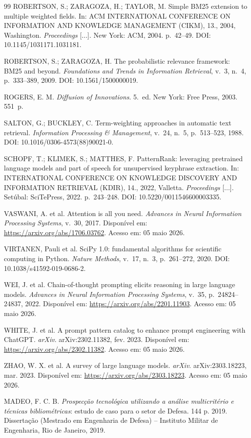 \documentclass[12pt, a4paper]{article}
\begin{document}
\begin{thebibliography}{99}
ROBERTSON, S.; ZARAGOZA, H.; TAYLOR, M.
Simple BM25 extension to multiple weighted fields.
In: ACM INTERNATIONAL CONFERENCE ON INFORMATION AND KNOWLEDGE MANAGEMENT
(CIKM), 13., 2004, Washington. \textit{Proceedings} [...]. New York: ACM,
2004. p.~42--49. DOI: 10.1145/1031171.1031181.

ROBERTSON, S.; ZARAGOZA, H.
The probabilistic relevance framework: BM25 and beyond.
\textit{Foundations and Trends in Information Retrieval}, v.~3, n.~4,
p.~333--389, 2009. DOI: 10.1561/1500000019.

ROGERS, E. M.
\textit{Diffusion of Innovations}.
5.~ed. New York: Free Press, 2003. 551~p.

SALTON, G.; BUCKLEY, C.
Term-weighting approaches in automatic text retrieval.
\textit{Information Processing \& Management}, v.~24, n.~5, p.~513--523, 1988.
DOI: 10.1016/0306-4573(88)90021-0.

SCHOPF, T.; KLIMEK, S.; MATTHES, F.
PatternRank: leveraging pretrained language models and part of speech for
unsupervised keyphrase extraction.
In: INTERNATIONAL CONFERENCE ON KNOWLEDGE DISCOVERY AND INFORMATION RETRIEVAL
(KDIR), 14., 2022, Valletta. \textit{Proceedings} [...]. Setúbal: SciTePress,
2022. p.~243--248. DOI: 10.5220/0011546600003335.

VASWANI, A. et al.
Attention is all you need.
\textit{Advances in Neural Information Processing Systems}, v.~30, 2017.
Disponível em: \url{https://arxiv.org/abs/1706.03762}.
Acesso em: 05 maio 2026.

VIRTANEN, Pauli et al.
SciPy 1.0: fundamental algorithms for scientific computing in Python.
\textit{Nature Methods}, v.~17, n.~3, p.~261--272, 2020.
DOI: 10.1038/s41592-019-0686-2.

WEI, J. et al.
Chain-of-thought prompting elicits reasoning in large language models.
\textit{Advances in Neural Information Processing Systems}, v.~35,
p.~24824--24837, 2022.
Disponível em: \url{https://arxiv.org/abs/2201.11903}.
Acesso em: 05 maio 2026.

WHITE, J. et al.
A prompt pattern catalog to enhance prompt engineering with ChatGPT.
\textit{arXiv}. arXiv:2302.11382, fev. 2023.
Disponível em: \url{https://arxiv.org/abs/2302.11382}.
Acesso em: 05 maio 2026.

ZHAO, W. X. et al.
A survey of large language models.
\textit{arXiv}. arXiv:2303.18223, mar. 2023.
Disponível em: \url{https://arxiv.org/abs/2303.18223}.
Acesso em: 05 maio 2026.

MADEO, F. C. B.
\textit{Prospecção tecnológica utilizando a análise multicritério e técnicas
bibliométricas}: estudo de caso para o setor de Defesa. 144 p. 2019.
Dissertação (Mestrado em Engenharia de Defesa) -- Instituto Militar de
Engenharia, Rio de Janeiro, 2019.

\end{thebibliography}
\end{document}
